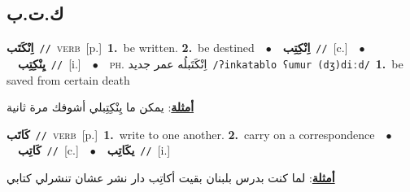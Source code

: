 \documentclass[10pt,a4paper,twoside]{article} %
\begin{document}
\begin{multicols}{2}
\vspace{-3mm}
\subsection*{\color{blue}\foreignlanguage{arabic}{ك.ت.ب}\color{blue}{}} 

{\setlength\topsep{0pt}\textbf{\foreignlanguage{arabic}{اِنْكَتَب}}\ {\color{gray}\texttt{//}\color{black}}\ \textsc{verb}\ [p.]\ \textbf{1.}~be written.  \textbf{2.}~be destined\ \ $\bullet$\ \ \setlength\topsep{0pt}\textbf{\foreignlanguage{arabic}{اِنْكِتِب}}\ {\color{gray}\texttt{//}\color{black}}\ [c.]\ \ $\bullet$\ \ \setlength\topsep{0pt}\textbf{\foreignlanguage{arabic}{يِنْكِتِب}}\ {\color{gray}\texttt{//}\color{black}}\ [i.]\ \ $\bullet$\ \ \textsc{ph.} \color{gray} \foreignlanguage{arabic}{اِنْكَتَبلُه عمر جديد}\color{black}\ {\color{gray}\texttt{/{\sffamily ʔinkatablo ʕumur (dʒ)diːd}/}\color{black}}\ \textbf{1.}~be saved from certain death\  \begin{flushright}\color{gray}\foreignlanguage{arabic}{\textbf{\underline{\foreignlanguage{arabic}{أمثلة}}}: يمكن ما يِنْكِتِبلي أشوفك مرة ثانية}\end{flushright}\color{black}} \vspace{2mm}

{\setlength\topsep{0pt}\textbf{\foreignlanguage{arabic}{كَاتَب}}\ {\color{gray}\texttt{//}\color{black}}\ \textsc{verb}\ [p.]\ \textbf{1.}~write to one another.  \textbf{2.}~carry on a correspondence\ \ $\bullet$\ \ \setlength\topsep{0pt}\textbf{\foreignlanguage{arabic}{كَاتِب}}\ {\color{gray}\texttt{//}\color{black}}\ [c.]\ \ $\bullet$\ \ \setlength\topsep{0pt}\textbf{\foreignlanguage{arabic}{يكَاتِب}}\ {\color{gray}\texttt{//}\color{black}}\ [i.]\  \begin{flushright}\color{gray}\foreignlanguage{arabic}{\textbf{\underline{\foreignlanguage{arabic}{أمثلة}}}: لما كنت بدرس بلبنان بقيت أكاتِب دار نشر عشان تنشرلي كتابي}\end{flushright}\color{black}} \vspace{2mm}


\end{multicols}
\end{document}
